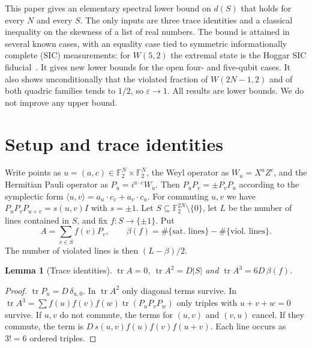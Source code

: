 \documentclass[aps,pra,onecolumn,11pt,superscriptaddress,nofootinbib]{revtex4-2}
\newtheorem{lemma}[theorem]{Lemma}
\theoremstyle{definition}
\theoremstyle{remark}
\newcommand{\tr}{\operatorname{tr}}
\begin{document}
This paper gives an elementary spectral lower bound on $d(S)$ that holds for every $N$ and
every $S$. The only inputs are three trace identities and a classical inequality on the
skewness of a list of real numbers. The bound is attained in several known cases, with an
equality case tied to symmetric informationally complete (SIC) measurements: for $W(5,2)$ the
extremal state is the Hoggar SIC fiducial~\cite{Stacey2016,Zhu2015,GodsilRoy2009}. It gives
new lower bounds for the open four- and five-qubit cases. It also shows unconditionally that the
violated fraction of $W(2N-1,2)$ and of both quadric families tends to $1/2$, so $\varepsilon\to1$. All results are lower
bounds. We do not improve any upper bound.

\section{Setup and trace identities}

Write points as $u=(a,c)\in\mathbb F_2^N\times\mathbb F_2^N$, the Weyl operator as
$W_u=X^aZ^c$, and the Hermitian Pauli operator as $P_u=i^{a\cdot c}W_u$. Then
$P_uP_v=\pm P_vP_u$ according to the symplectic form $\langle u,v\rangle=a_u\cdot c_v+a_v\cdot c_u$.
For commuting $u,v$ we have $P_uP_vP_{u+v}=s(u,v)I$ with $s=\pm1$. Let $S\subseteq\mathbb F_2^{2N}\setminus\{0\}$, let $L$ be the number of lines contained in $S$, and fix
$f:S\to\{\pm1\}$. Put
\begin{equation}
  A=\sum_{v\in S}f(v)P_v,\qquad
  \beta(f)=\#\{\text{sat.\ lines}\}-\#\{\text{viol.\ lines}\}.
\end{equation}
The number of violated lines is then $(L-\beta)/2$.

\begin{lemma}[Trace identities]\label{lem:traces}
$\tr A=0$, $\tr A^2=D|S|$ and $\tr A^3=6D\,\beta(f)$.
\end{lemma}
\begin{proof}
$\tr P_u=D\,\delta_{u,0}$. In $\tr A^2$ only diagonal terms survive. In
$\tr A^3=\sum f(u)f(v)f(w)\tr(P_uP_vP_w)$ only triples with $u+v+w=0$ survive. If $u,v$
do not commute, the terms for $(u,v)$ and $(v,u)$ cancel. If they commute, the term is
$D\,s(u,v)f(u)f(v)f(u+v)$. Each line occurs as $3!=6$ ordered triples.
\end{proof}
\end{document}
